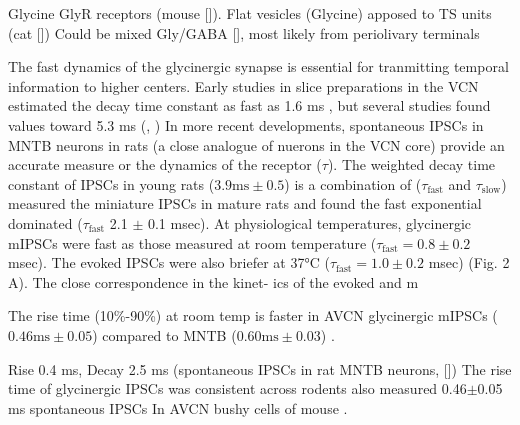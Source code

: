 


Glycine GlyR receptors (mouse []).
Flat vesicles (Glycine) apposed to TS units (cat [])     
Could be mixed Gly/GABA [], most likely from periolivary terminals 
                               
The fast dynamics of the glycinergic synapse is essential for tranmitting temporal information to higher centers.
Early studies in slice preparations in the VCN estimated the decay time constant as fast as 1.6 ms , but several studies found values toward  5.3 ms (\citep*[mouse][]{OertelWickesberg:1993,WickesbergOertel:1993},  \citep*[guinea pig VCN][]{HartyManis:1998})
In more recent developments, spontaneous IPSCs in MNTB neurons in rats (a close analogue of nuerons in the VCN core) provide an accurate measure or the dynamics of the receptor ($\tau$). The weighted decay time constant of IPSCs in young rats ($3.9 \mathrm{ms} \pm 0.5$) is a combination of ($\tau_{\textrm{fast}}$ and $\tau_{\textrm{slow}}$)
\citet{AwatramaniTurecekEtAl:2004} measured the miniature IPSCs in mature rats and found the fast exponential dominated ($\tau_{\textrm{fast}}$ 2.1 $\pm$ 0.1 msec).  %
 At physiological temperatures, glycinergic mIPSCs were fast as those measured at room temperature ($\tau_{\textrm{fast}}=0.8 \pm 0.2$ msec). The evoked IPSCs were also briefer at 37°C ($\tau_{\textrm{fast}}=1.0 \pm 0.2$ msec) (Fig. 2 A). The close correspondence in the kinet-
ics of the evoked and m
 
The rise time (10\%-90\%) at room temp is faster in AVCN glycinergic mIPSCs ($0.46 \mathrm{ms} \pm 0.05$) compared to MNTB ($0.60 \mathrm{ms} \pm 0.03$) \citep{LimOleskevichEtAl:2003}.

Rise 0.4 ms, Decay 2.5 ms (spontaneous IPSCs in rat MNTB neurons, [])
The rise time of glycinergic IPSCs was consistent across rodents also measured 0.46$\pm$0.05 ms spontaneous IPSCs In AVCN bushy cells of mouse \citep{LimOleskevichEtAl:2003}.

